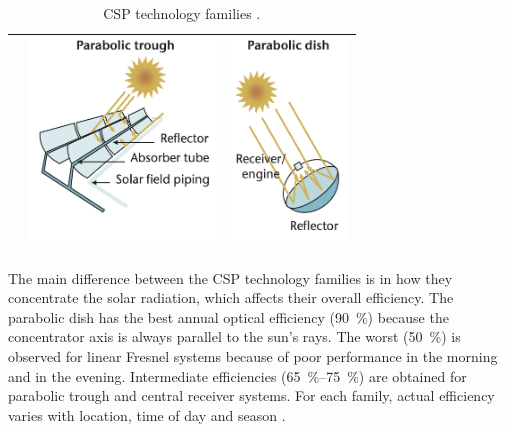 \begin{table}[h!]
\begin{tabular}{  m{5cm}  m{5cm}  m{5cm}  }
    &
    \begin{minipage}{5cm}
      \centering
	  \includegraphics[height=55mm]{FIG/SUM/PT}
    \end{minipage}
    & 
    \begin{minipage}{5cm}
      \centering
	  \includegraphics[height=55mm]{FIG/SUM/PD}
    \end{minipage}    
    \\ \hline
  \end{tabular}
  \caption[CSP technology families.]{CSP technology families \cite{IEA2014b}.}\label{tbl: CSPtech}
\end{table}


The main difference between the CSP technology families is in how they concentrate the solar radiation, which affects their overall efficiency. The parabolic dish has the best annual optical efficiency (\SI{90}{\percent}) because the concentrator axis is always parallel to the sun's rays. The worst (\SI{50}{\percent}) is observed for linear Fresnel systems because of poor performance in the morning and in the evening. Intermediate efficiencies (\SIrange{65}{75}{\percent}) are obtained for parabolic trough and central receiver systems. For each family, actual efficiency varies with location, time of day and season \cite{EASAC2011}.

